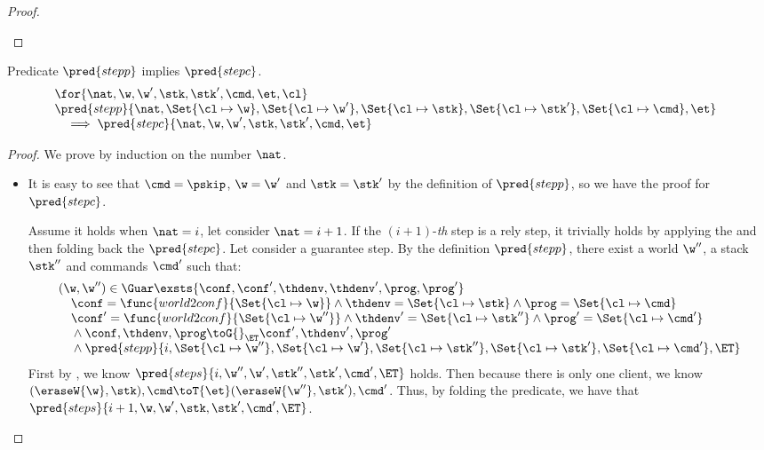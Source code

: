 \begin{proof}
\begin{itemize}
\begin{itemize}
\begin{itemize}
    \end{itemize}
\end{itemize}
\end{itemize}
\end{proof}


\begin{lemma}
\label{lem:prgram-step-to-command-step}
Predicate \( \pred{stepp} \) implies  \( \pred{stepc} \).
\[
\begin{array}{@{}l}
    \for{\nat, \w, \w', \stk, \stk', \cmd, \et, \cl} \\
    \pred{stepp}{\nat, \Set{\cl \mapsto \w},\Set{\cl \mapsto \w'}, \Set{\cl \mapsto \stk}, \Set{ \cl \mapsto \stk'}, \Set{\cl \mapsto \cmd}, \et}  \\ 
    \quad \implies \pred{stepc}{\nat, \w, \w', \stk, \stk', \cmd, \et} \\
\end{array}
\]
\end{lemma}
\begin{proof}
We prove by induction on the number \( \nat \).

\begin{itemize}

\item {}
It is easy to see that \( \cmd = \pskip \), \( \w = \w'\) and \( \stk = \stk' \) by the definition of \(  \pred{stepp}\), so we have the proof for \( \pred{stepc} \).

Assume it holds when \( \nat = i \), let consider \( \nat = i + 1 \).
If the \((i + 1)\)-\emph{th} step is a rely step, it trivially holds by applying the \ih and then folding back the \( \pred{stepc} \).
Let consider a guarantee step.
By the definition \( \pred{stepp}\), there exist a world \( \w'' \), a stack \( \stk'' \) and commands \( \cmd' \) such that:
\[
\begin{array}{@{}l@{}}
    (\w, \w'') \in \Guar  
    \exsts{\conf, \conf', \thdenv, \thdenv', \prog, \prog'} \\
    \quad \conf = \func{world2conf}{\Set{\cl \mapsto \w}}
    \land \thdenv =  \Set{\cl \mapsto \stk} 
    \land \prog = \Set{\cl \mapsto \cmd} \\
    \quad {} \conf' = \func{world2conf}{\Set{\cl \mapsto \w''}}
    \land \thdenv' =  \Set{\cl \mapsto \stk''} 
    \land \prog' = \Set{\cl \mapsto \cmd'} \\
    \quad {} \land  \conf, \thdenv , \prog \toG{}_{\ET} \conf', \thdenv' , \prog'   \\
    \quad {} \land \pred{stepp}{ i, \Set{\cl \mapsto \w''},\Set{\cl \mapsto \w'}, \Set{\cl \mapsto \stk''}, \Set{ \cl \mapsto \stk'}, \Set{\cl \mapsto \cmd'}, \ET}
\end{array}
\]
First by \ih, we know  \( \pred{steps}{ i, \w'', \w', \stk'', \stk', \cmd', \ET} \) holds.
Then because there is only one client, we know \( (\eraseW{\w}, \stk ), \cmd \toT{\et} (\eraseW{\w''}, \stk'), \cmd' \).
Thus, by folding the predicate, we have that \( \pred{steps}{ i + 1, \w, \w', \stk, \stk', \cmd', \ET} \).
\end{itemize}
\end{proof}
